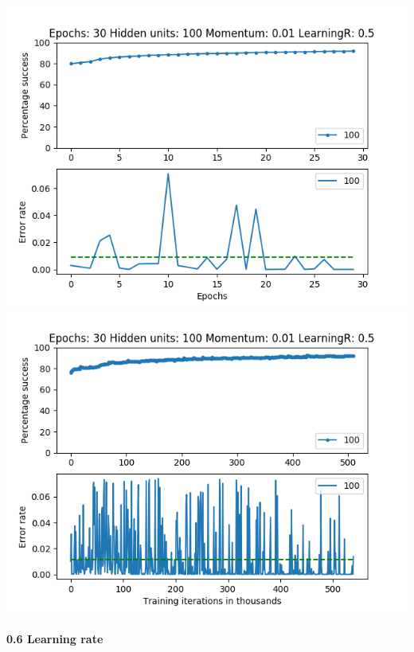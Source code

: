 \documentclass[11pt]{article}
\makeatletter
\def\maxwidth{\ifdim\Gin@nat@width>\linewidth\linewidth
    \else\Gin@nat@width\fi}
\let\Oldincludegraphics\includegraphics
\renewcommand{\includegraphics}[1]{\Oldincludegraphics[width=.8\maxwidth]{#1}}
\makeatother
\begin{document}
\includegraphics{Experiment2/E2_NN_Epoch_Momentum_0.01_30Epochs_100_LR_0.5_Hiddenunits.png}
\includegraphics{Experiment2/E2_NN_Training_Momentum_0.01_30Epochs_100_LR_0.5_Hiddenunits.png}

\hypertarget{learning-rate-6}{%
\paragraph{0.6 Learning rate}\label{learning-rate-6}}
\end{document}
